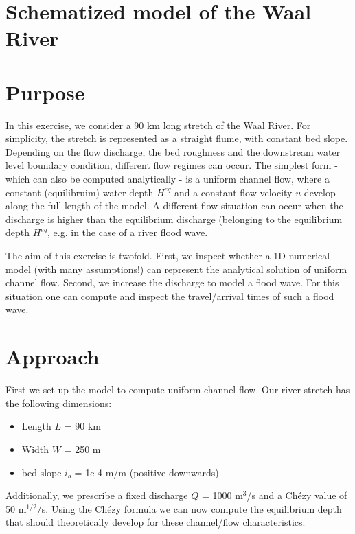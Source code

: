 \section{Schematized model of the Waal River}
\newrefsegment

\section*{Purpose}
In this exercise, we consider a 90 km long stretch of the Waal River. For simplicity, the stretch is represented as a straight flume, with constant bed slope. Depending on the flow discharge, the bed roughness and the downstream water level boundary condition, different flow regimes can occur. The simplest form - which can also be computed analytically - is a uniform channel flow, where a constant (equilibruim) water depth $H^{eq}$ and a constant flow velocity $u$ develop along the full length of the model.
A different flow situation can occur when the discharge is higher than the equilibrium discharge (belonging to the equilibrium depth $H^{eq}$, e.g. in the case of a river flood wave. 

The aim of this exercise is twofold. First, we inspect whether a 1D numerical model (with many assumptions!) can represent the analytical solution of uniform channel flow. Second, we increase the discharge to model a flood wave. For this situation one can compute and inspect the travel/arrival times of such a flood wave.

\section*{Approach}
First we set up the model to compute uniform channel flow. Our river stretch has the following dimensions:

\begin{itemize}
  \item Length $L$ = 90 km
  \item Width $W$ = 250 m
  \item bed slope $i_b$ = 1e-4 m/m (positive downwards)
\end{itemize}

Additionally, we prescribe a fixed discharge $Q$ = 1000 m$^3$/s and a Ch\'ezy value of 50 m$^{1/2}$/s. Using the Ch\'ezy formula we can now compute the equilibrium depth that should theoretically develop for these channel/flow characteristics:

